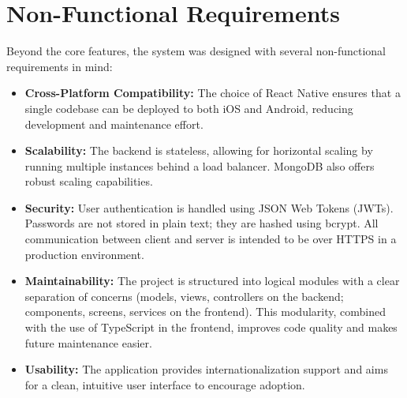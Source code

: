 \section{Non-Functional Requirements}
Beyond the core features, the system was designed with several non-functional requirements in mind:
\begin{itemize}
    \item \textbf{Cross-Platform Compatibility:} The choice of React Native ensures that a single codebase can be deployed to both iOS and Android, reducing development and maintenance effort.
    \item \textbf{Scalability:} The backend is stateless, allowing for horizontal scaling by running multiple instances behind a load balancer. MongoDB also offers robust scaling capabilities.
    \item \textbf{Security:} User authentication is handled using JSON Web Tokens (JWTs). Passwords are not stored in plain text; they are hashed using bcrypt. All communication between client and server is intended to be over HTTPS in a production environment.
    \item \textbf{Maintainability:} The project is structured into logical modules with a clear separation of concerns (models, views, controllers on the backend; components, screens, services on the frontend). This modularity, combined with the use of TypeScript in the frontend, improves code quality and makes future maintenance easier.
    \item \textbf{Usability:} The application provides internationalization support and aims for a clean, intuitive user interface to encourage adoption.
\end{itemize}

